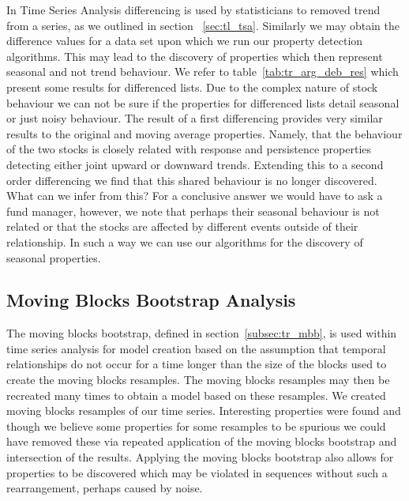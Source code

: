 In Time Series Analysis differencing is used by statisticians to
removed trend from a series, as we outlined in section ~\ref{sec:tl_tsa}.
Similarly we may obtain the difference values for a data set upon
which we run our property detection algorithms. This may lead to the
discovery of properties which then represent seasonal and not trend
behaviour. We refer to table~\ref{tab:tr_arg_deb_res} which
present some results for differenced lists. Due to the complex nature
of stock behaviour we can not be sure if the properties for
differenced lists detail seasonal or just noisy behaviour. The result
of a first differencing provides very similar results to the original
and moving average properties. Namely, that the behaviour of the two
stocks is closely related with response and persistence properties
detecting either joint upward or downward trends. Extending this to a
second order differencing we find that this shared behaviour is no
longer discovered. What can we infer from this?  For a conclusive
answer we would have to ask a fund manager, however, we note
that perhaps their seasonal behaviour is not related or that the
stocks are affected by different events outside of their
relationship. In such a way we can use our algorithms for the
discovery of seasonal properties.


\subsection{Moving Blocks Bootstrap Analysis}\label{subsec:tr_mbb_analysis}

The moving blocks bootstrap, defined in section~\ref{subsec:tr_mbb},
is used within time series analysis for model creation based on the
assumption that temporal relationships do not occur for a time longer
than the size of the blocks used to create the moving blocks
resamples. The moving blocks resamples may then be recreated many
times to obtain a model based on these resamples. We created moving
blocks resamples of our time series. Interesting properties were found
and though we believe some properties for some resamples to be
spurious we could have removed these via repeated application of the
moving blocks bootstrap and intersection of the results.
Applying the moving blocks bootstrap also allows for properties to be
discovered which may be violated in sequences without such a
rearrangement, perhaps caused by noise.

\medskip

